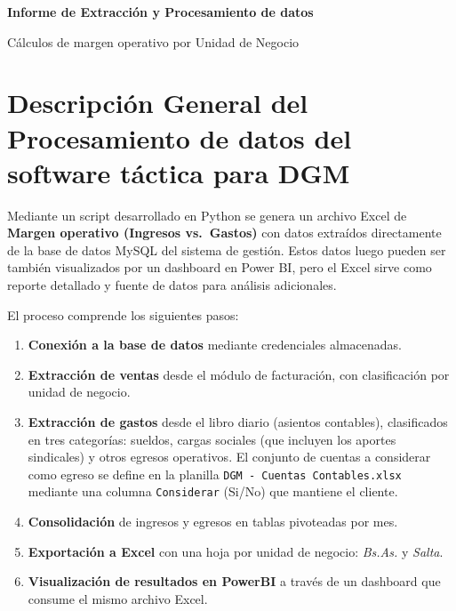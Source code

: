 \documentclass[12pt, a4paper]{article}
\begin{document}
\begin{center}
    {\Huge\bfseries\color{azuloscuro} Informe de Extracción y Procesamiento de datos\par}
    \vspace{0.5cm}
    {\Large\color{gray} Cálculos de margen operativo por Unidad de Negocio\par}
\end{center}

\section{Descripción General del Procesamiento de datos del software táctica para DGM}

Mediante un script desarrollado en Python se genera un archivo Excel de \textbf{Margen operativo (Ingresos vs.\ Gastos)} con datos extraídos directamente de la base de datos MySQL del sistema de gestión. Estos datos luego pueden ser también visualizados por un dashboard en Power BI, pero el Excel sirve como reporte detallado y fuente de datos para análisis adicionales.

El proceso comprende los siguientes pasos:

\begin{enumerate}
    \item \textbf{Conexión a la base de datos} mediante credenciales almacenadas.
    \item \textbf{Extracción de ventas} desde el módulo de facturación, con clasificación por unidad de negocio.
    \item \textbf{Extracción de gastos} desde el libro diario (asientos contables), clasificados en tres categorías: sueldos, cargas sociales (que incluyen los aportes sindicales) y otros egresos operativos. El conjunto de cuentas a considerar como egreso se define en la planilla \texttt{DGM - Cuentas Contables.xlsx} mediante una columna \texttt{Considerar} (Si/No) que mantiene el cliente.
    \item \textbf{Consolidación} de ingresos y egresos en tablas pivoteadas por mes.
    \item \textbf{Exportación a Excel} con una hoja por unidad de negocio: \emph{Bs.As.} y \emph{Salta}.
    \item \textbf{Visualización de resultados en PowerBI} a través de un dashboard que consume el mismo archivo Excel.
\end{enumerate}

\end{document}
